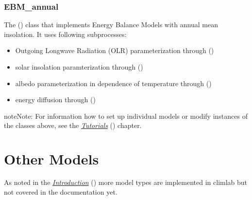 \documentclass[a4paper,10pt,english]{sphinxmanual}
\begin{document}
\subsubsection{EBM\_annual}
\label{models:ebm-annual}
The {\hyperref[api/climlab.model:climlab.model.ebm.EBM_annual]{\emph{}}} () class that implements Energy Balance Models with annual mean insolation.
It uses following subprocesses:
\begin{itemize}
\item {} 
Outgoing Longwave Radiation (OLR) parameterization through
{\hyperref[api/climlab.radiation:climlab.radiation.AplusBT.AplusBT]{\emph{}}} ()

\item {} 
solar insolation paramterization through
{\hyperref[api/climlab.radiation:climlab.radiation.insolation.AnnualMeanInsolation]{\emph{}}} ()

\item {} 
albedo parameterization in dependence of temperature through
{\hyperref[api/climlab.surface:climlab.surface.albedo.StepFunctionAlbedo]{\emph{}}} ()

\item {} 
energy diffusion through
{\hyperref[api/climlab.dynamics:climlab.dynamics.diffusion.MeridionalDiffusion]{\emph{}}} ()

\end{itemize}

\begin{notice}{note}{Note:}
For information how to set up individual models or modify instances of the classes above, see the {\hyperref[tutorial:tutorial]{\emph{Tutorials}}} () chapter.
\end{notice}


\section{Other Models}
\label{models:other-models}
As noted in the {\hyperref[intro:introduction]{\emph{Introduction}}} () more model types are implemented in climlab but not covered in the documentation yet.
\end{document}
